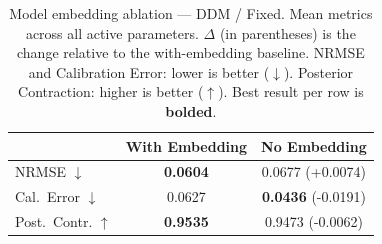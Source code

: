 \begin{table}[t]
\centering
\caption{Model embedding ablation — DDM / Fixed. Mean metrics across
all active parameters. $\Delta$ (in parentheses) is the change relative to the
with-embedding baseline. NRMSE and Calibration Error: lower is better ($\downarrow$).
Posterior Contraction: higher is better ($\uparrow$). Best result per row is
\textbf{bolded}.}
\label{tab:embed_ablation_ddm_fixed}
\begin{tabular}{lcc}
\toprule
 & With Embedding & No Embedding \\
\midrule
NRMSE $\downarrow$ & \textbf{0.0604} & 0.0677 \small{(+0.0074)} \\
Cal.\ Error $\downarrow$ & 0.0627 & \textbf{0.0436} \small{(-0.0191)} \\
Post.\ Contr. $\uparrow$ & \textbf{0.9535} & 0.9473 \small{(-0.0062)} \\
\bottomrule
\end{tabular}
\end{table}